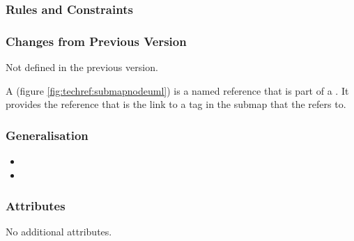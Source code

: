\subsubsection{Rules and Constraints}

\begin{valrules}
\end{valrules}


\subsubsection{Changes from Previous Version}

Not defined in the previous version.

\label{defn:SubmapTerminal}

A  (figure \ref{fig:techref:submapnodeuml}) is a named reference that is part of a
. It provides the reference that is the link to a
tag in the submap that the  refers to.

\subsubsection{Generalisation}

\begin{itemize}
\item {}
\item {}
\end{itemize}

\subsubsection{Attributes}

No additional attributes.

